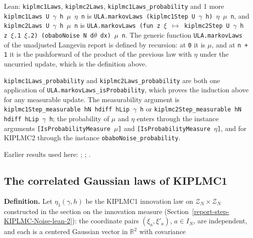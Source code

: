 \documentclass[11pt,a4paper]{report}
\begin{document}
\begin{leanbox}{Lean: \texttt{kiplmc1Laws}, \texttt{kiplmc2Laws}, \texttt{kiplmc1Laws\_\allowbreak{}probability} and 1 more}
\texttt{kiplmc1\allowbreak{}Laws U \ensuremath{\gamma} h \ensuremath{\mu} \ensuremath{\eta} n} is \texttt{ULA.\allowbreak{}markov\allowbreak{}Laws (kiplmc1\allowbreak{}Step U \ensuremath{\gamma} h) \ensuremath{\eta} \ensuremath{\mu} n}, and \texttt{kiplmc2\allowbreak{}Laws U \ensuremath{\gamma} h \ensuremath{\mu} n} is \texttt{ULA.\allowbreak{}markov\allowbreak{}Laws (fun z \ensuremath{\xi} \ensuremath{\mapsto} kiplmc2\allowbreak{}Step U \ensuremath{\gamma} h z \ensuremath{\xi}.\allowbreak{}1 \ensuremath{\xi}.\allowbreak{}2) (obabo\allowbreak{}Noise N d\ensuremath{\theta} dx) \ensuremath{\mu} n}. The generic function \texttt{ULA.\allowbreak{}markov\allowbreak{}Laws} of the unadjusted Langevin report is defined by recursion: at \texttt{0} it is \texttt{\ensuremath{\mu}}, and at \texttt{n + 1} it is the pushforward of the product of the previous law with \texttt{\ensuremath{\eta}} under the uncurried update, which is the definition above.




\texttt{kiplmc1\allowbreak{}Laws\_\allowbreak{}probability} and \texttt{kiplmc2\allowbreak{}Laws\_\allowbreak{}probability} are both one application of \texttt{ULA.\allowbreak{}markov\allowbreak{}Laws\_\allowbreak{}is\allowbreak{}Probability}, which proves the induction above for any measurable update. The measurability argument is \texttt{kiplmc1\allowbreak{}Step\_\allowbreak{}measurable h\allowbreak{}N hdiff h\allowbreak{}Lip \ensuremath{\gamma} h} or \texttt{kiplmc2\allowbreak{}Step\_\allowbreak{}measurable h\allowbreak{}N hdiff h\allowbreak{}Lip \ensuremath{\gamma} h}; the probability of \texttt{\ensuremath{\mu}} and \texttt{\ensuremath{\eta}} enters through the instance arguments \texttt{[Is\allowbreak{}Probability\allowbreak{}Measure \ensuremath{\mu}]} and \texttt{[Is\allowbreak{}Probability\allowbreak{}Measure \ensuremath{\eta}]}, and for KIPLMC2 through the instance \texttt{obabo\allowbreak{}Noise\_\allowbreak{}probability}.
\end{leanbox}


Earlier results used here: \cite[Section~3.33.11]{LangevinLean2026ULASC}; \cite[Section~3.33.6]{LangevinLean2026ULASC}; \cite[Section~3.1.1]{LangevinLean2026IPLA}.
\subsection{\texorpdfstring{The correlated Gaussian laws of KIPLMC1}{The correlated Gaussian laws of KIPLMC1}}
\label{report-step-KIPLMC-Laws-lean-3}


\textbf{Definition.} Let \(\eta_1(\gamma,h)\) be the KIPLMC1 innovation law on \(\mathcal Z_N\times\mathcal Z_N\) constructed in the section on the innovation measure (Section~\ref{report-step-KIPLMC-Noise-lean-2}): the coordinate pairs \((\xi_a,\xi'_a)\), \(a\in I_N\), are independent, and each is a centered Gaussian vector in \(\mathbb R^2\) with covariance
\end{document}
